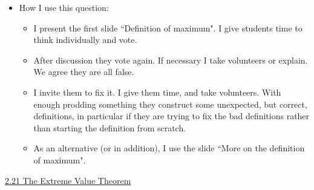 \documentclass[11pt]{article}
\newcommand{\n}{\newpage}
\newcommand{\nl}{\hfill \vspace{-1.1\baselineskip}} %
\newcommand{\vxxi}{\hspace{8mm} \href{https://www.youtube.com/watch?v=r5Tz0wi5RRU&list=PLlwePzQY_wW8P_I8BFgm0-upywEwTKd8_&index=21}{2.21 The Extreme Value Theorem}}
\begin{document}
\begin{comments}
\nl
	\begin{itemize}
		\item  How I use this question:
			\begin{itemize}
				\item  I present the first slide ``Definition of maximum".  I give students time to think individually and vote.
				\item  After discussion they vote again.  If necessary I take volunteers or explain.  We agree they are all false.
				\item I invite them to fix it.  I give them time, and take volunteers.   With enough prodding something they construct some unexpected, but correct, definitions, in particular if they are trying to fix the bad definitions rather than starting the definition from scratch.
				\item As an alternative (or in addition), I use the slide ``More on the definition of maximum".
			\end{itemize}
	\end{itemize}
\end{comments}

\begin{videos}
\vxxi
\end{videos}

\n



\end{document}

